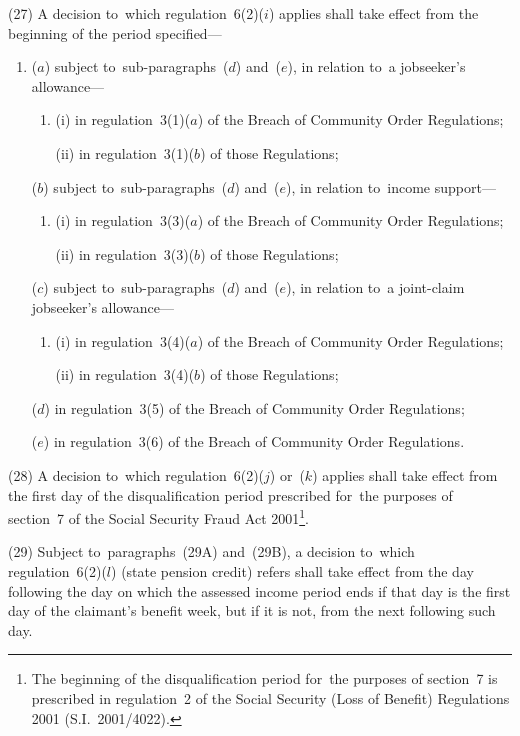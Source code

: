 \documentclass[12pt,a4paper]{article}
\begin{document}
(27) A decision to~which regulation~6(2)($i$) applies shall take effect from the beginning of the period specified—
\begin{enumerate}\item[]
($a$) subject to~sub-paragraphs~($d$)  and~($e$), in relation to~a jobseeker’s allowance—
\begin{enumerate}\item[]
(i) in regulation~3(1)($a$)  of the Breach of Community Order Regulations;

(ii) in regulation~3(1)($b$)  of those Regulations;
\end{enumerate}

($b$) subject to~sub-paragraphs~($d$)  and~($e$), in relation to~income support—
\begin{enumerate}\item[]
(i) in regulation~3(3)($a$)  of the Breach of Community Order Regulations;

(ii) in regulation~3(3)($b$)  of those Regulations;
\end{enumerate}

($c$) subject to~sub-paragraphs~($d$)  and~($e$), in relation to~a joint-claim jobseeker’s allowance—
\begin{enumerate}\item[]
(i) in regulation~3(4)($a$)  of the Breach of Community Order Regulations;

(ii) in regulation~3(4)($b$)  of those Regulations;
\end{enumerate}

($d$) in regulation~3(5) of the Breach of Community Order Regulations;

($e$) in regulation~3(6) of the Breach of Community Order Regulations.
\end{enumerate}

(28) A decision to~which regulation~6(2)($j$)  or~($k$)  applies shall take effect from the first day of the disqualification period prescribed for~the purposes of section~7 of the Social Security Fraud Act 2001\footnote{The beginning of the disqualification period for~the purposes of section~7 is prescribed in regulation~2 of the Social Security (Loss of Benefit) Regulations 2001 (S.I.~2001/4022).}.

(29) 
Subject to~paragraphs~(29A) and~(29B), a  %
decision to~which regulation~6(2)($l$) (state pension credit) refers shall take effect from the day following the day on which the assessed income period ends if that day is the first day of the claimant’s benefit week, but if it is not, from the next following such day.
\end{document}
